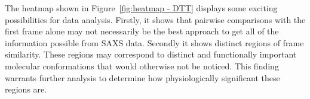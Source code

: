 The heatmap shown in Figure~\ref{fig:heatmap - DTT} displays some exciting possibilities for data analysis.
Firstly, it shows that pairwise comparisons with the first frame alone may not necessarily be the best approach to get all of the information possible from SAXS data.
Secondly it shows distinct regions of frame similarity.
These regions may correspond to distinct and functionally important molecular conformations that would otherwise not be noticed.
This finding warrants further analysis to determine how physiologically significant these regions are.
